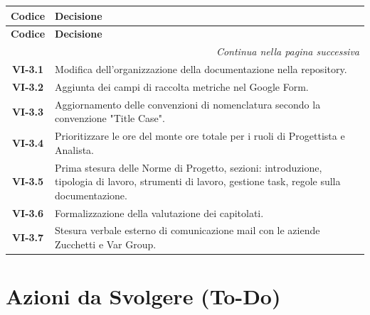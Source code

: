\renewcommand{\arraystretch}{1.3}
\vspace{-0.3cm}
\noindent
\begin{longtable}{c p{12cm}}
    \toprule
    \textbf{Codice} & \textbf{Decisione} \\
    \midrule
    \endfirsthead

    \toprule
    \textbf{Codice} & \textbf{Decisione} \\
    \midrule
    \endhead

    \midrule
    \multicolumn{2}{r}{\textit{Continua nella pagina successiva}} \\
    \midrule
    \endfoot

    \bottomrule
    \endlastfoot

    \textbf{VI-3.1} & Modifica dell'organizzazione della documentazione nella repository. \\
    \textbf{VI-3.2} & Aggiunta dei campi di raccolta metriche nel Google Form. \\
    \textbf{VI-3.3} & Aggiornamento delle convenzioni di nomenclatura secondo la convenzione "Title Case". \\
    \textbf{VI-3.4} & Prioritizzare le ore del monte ore totale per i ruoli di Progettista e Analista. \\
    \textbf{VI-3.5} & Prima stesura delle Norme di Progetto, sezioni: introduzione, tipologia di lavoro, strumenti di lavoro, gestione task, regole sulla documentazione. \\
    \textbf{VI-3.6} & Formalizzazione della valutazione dei capitolati. \\
    \textbf{VI-3.7} & Stesura verbale esterno di comunicazione mail con le aziende Zucchetti e Var Group. \\
\end{longtable}

\section{Azioni da Svolgere (To-Do)}

\renewcommand{\arraystretch}{1.3}

